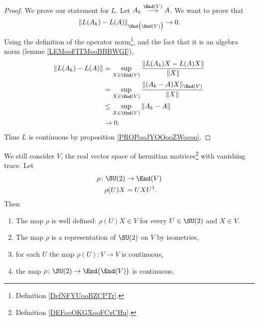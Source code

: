 \begin{proof}
    We prove our statement for \( L\). Let \( A_k\stackrel{\End(V)}{\longrightarrow}A\). We want to prove that
    \begin{equation}
        \| L(A_k)-L(A) \|_{\End\big( \End(V) \big)}\to 0.
    \end{equation}
    Using the definition of the operator norm\footnote{Definition \ref{DefNFYUooBZCPTr}.}, and the fact that it is an algebra norm (lemme \ref{LEMooFITMooBBBWGI}),
    \begin{subequations}
        \begin{align}
            \| L(A_k)-L(A) \|&=\sup_{X\in \End(V)}\frac{ \| L(A_k)X-L(A)X \| }{ \| X \| }\\
            &=\sup_{X\in \End(V)}\frac{ \| (A_k-A)X \|_{\End(V)} }{ \| X \| }\\
            &\leq \sup_{X\in\End(V)}\| A_k-A \|\\
            &\to 0.
        \end{align}
    \end{subequations}
    Thus \( L\) is continuous by proposition \ref{PROPooJYOOooZWocoq}.
\end{proof}

\begin{proposition}     \label{PROPooRQUZooAoZzwx}
    We still consider \( V\), the real vector space of hermitian matrices\footnote{Definition \ref{DEFooOKGXooFCzCHu}.} with vanishing trace. Let
    \begin{equation}
        \begin{aligned}
            \rho\colon \SU(2)&\to \End(V) \\
            \rho(U)X&=UXU^{\dag}.
        \end{aligned}
    \end{equation}
    Then
    \begin{enumerate}
        \item
            The map \( \rho\) is well defined: \( \rho(U)X\in V\) for every \( U\in \SU(2)\) and \( X\in V\).
        \item
            The map \( \rho\) is a representation of \( \SU(2)\) on \( V\) by isometries,
        \item       \label{ITEMooBZUQooNXNVfs}
            for each \( U\) the map \( \rho(U)\colon V\to V\) is continuous,
        \item       \label{ITEMooGHZYooQuabWb}
            the map \( \rho\colon \SU(2)\to \End\big( \End(V)\big) \) is continuous.
    \end{enumerate}
\end{proposition}

